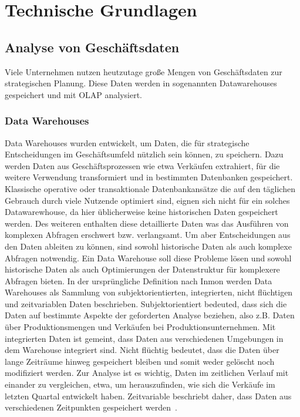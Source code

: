 \chapter{Technische Grundlagen}
\section{Analyse von Geschäftsdaten}
Viele Unternehmen nutzen heutzutage große Mengen von Geschäftsdaten zur strategischen Planung. Diese Daten werden in sogenannten Datawarehouses gespeichert und mit \acf{OLAP} analysiert.
\subsection{Data Warehouses}
Data Warehouses wurden entwickelt, um Daten, die für strategische Entscheidungen im Geschäftsumfeld nützlich sein können, zu speichern.
Dazu werden Daten aus Geschäftsprozessen wie etwa Verkäufen extrahiert, für die weitere Verwendung transformiert und in bestimmten Datenbanken gespeichert.
Klassische  operative oder transaktionale Datenbankansätze die auf den täglichen Gebrauch durch viele Nutzende optimiert sind, eignen sich nicht für ein solches Datawarewhouse, da hier üblicherweise keine historischen Daten gespeichert werden.
Des weiteren enthalten diese detaillierte Daten was das Ausführen von komplexen Abfragen erschwert bzw. verlangsamt.
Um aber Entscheidungen aus den Daten ableiten zu können, sind sowohl historische Daten als auch komplexe Abfragen notwendig.
Ein Data Warehouse soll diese Probleme lösen und sowohl historische Daten als auch Optimierungen der Datenstruktur für komplexere Abfragen bieten.
In der ursprüngliche Definition nach Inmon werden Data Warehouses als Sammlung von subjektorientierten, integrierten, nicht flüchtigen und zeitvariablen Daten beschrieben.
Subjektorientiert bedeuted, dass sich die Daten auf bestimmte Aspekte der geforderten Analyse beziehen, also z.B. Daten über Produktionsmengen und Verkäufen bei Produktionsunternehmen.
Mit integrierten Daten ist gemeint, dass Daten aus verschiedenen Umgebungen in dem Warehouse integriert sind.
Nicht flüchtig bedeutet, dass die Daten über lange Zeiträume hinweg gespeichert bleiben und somit weder gelöscht noch modifiziert werden.
Zur Analyse ist es wichtig, Daten im zeitlichen Verlauf mit einander zu vergleichen, etwa, um herauszufinden, wie sich die Verkäufe im letzten Quartal entwickelt haben.
Zeitvariable beschriebt daher, dass Daten aus verschiedenen Zeitpunkten gespeichert werden~\cite[s. 3-4]{vaisman_data_2022}.

